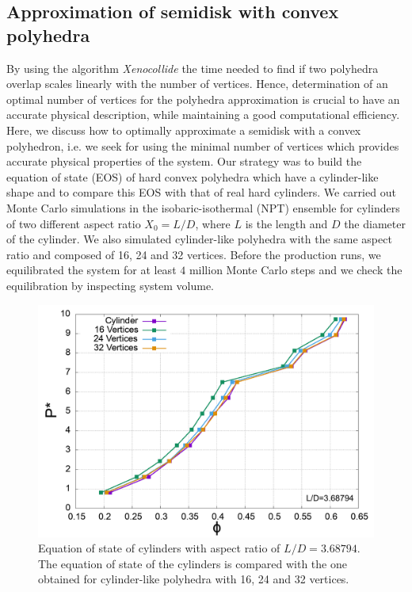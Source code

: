\documentclass[aip,jcp, amsmath, amssymb, reprint]{revtex4-1}
\begin{document}
\subsection{Approximation of semidisk with convex polyhedra}
By using the algorithm \textit{Xenocollide} the time needed to find if two polyhedra overlap scales 
linearly with the number of vertices.
Hence, determination of an optimal number of vertices for the polyhedra approximation is crucial to have an 
accurate physical description, while maintaining a good computational efficiency.
Here, we discuss how to optimally approximate a semidisk with a convex polyhedron, i.e. 
we seek for using the minimal number of vertices which provides accurate physical properties of the system. 
Our strategy was to build the equation of state (EOS) of hard convex polyhedra which have a cylinder-like 
shape and to compare this EOS with that of real hard cylinders.
We carried out Monte Carlo simulations in the isobaric-isothermal (NPT) ensemble for
cylinders of two different aspect ratio $X_0=L/D$, where $L$ is the length and $D$ the diameter of the cylinder. 
We also simulated cylinder-like polyhedra with the same aspect ratio and composed of 16, 24 and 32 vertices.
Before the production runs, we equilibrated the system for at least $4$ million Monte Carlo steps and we check 
the equilibration by inspecting system volume.
\begin{figure}[h!] \includegraphics[width=0.95\linewidth]{cylapprox.png}
  \caption{\label{fig:cylapprox} Equation of state of cylinders with aspect ratio of $L/D=3.68794$. The equation of
  state of the cylinders is compared with the one obtained for cylinder-like polyhedra with 16, 24 and 32 
vertices.}
\end{figure}
\end{document}
